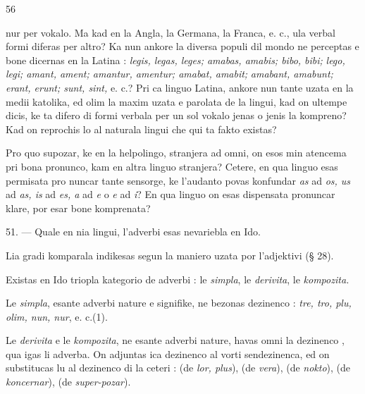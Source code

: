 \begin{VUpage}[60]{56}

\VUcontinue nur per vokalo. Ma kad en la Angla, la Germana, la Franca,\nl
e. c., ula verbal formi diferas per altro? Ka nun ankore la\nl
diversa populi dil mondo ne perceptas e bone dicernas en\nl
la Latina : \textit{legis, legas, leges; amabas, amabis; bibo, bibi;}\nl
\textit{lego, legi; amant, ament; amantur, amentur; amabat, amabit;}\nl
\textit{amabant, amabunt; erant, erunt; sunt, sint,} e. c.? Pri ca\nl
linguo Latina, ankore nun tante uzata en la medii katolika,\nl
ed olim la maxim uzata e parolata de la lingui, kad on\nl
ultempe dicis, ke ta difero di formi verbala per un sol\nl
vokalo jenas o jenis la kompreno? Kad on reprochis lo al\nl
naturala lingui che qui ta fakto existas?

Pro quo supozar, ke en la helpolingo, stranjera ad omni,\nl
on esos min atencema pri bona pronunco, kam en altra\nl
linguo stranjera? Cetere, en qua linguo esas permisata pro\cc
nuncar tante sensorge, ke l'audanto povas konfundar \textit{as} ad\nl
\textit{os, us} ad \textit{as, is} ad \textit{es, a} ad \textit{e} o \textit{e} ad \textit{i}? En qua linguo on esas\nl
dispensata pronuncar klare, por esar bone komprenata?

\VUsaut{7.19mm}
\VUsaut{5.79mm}

51. --- Quale en nia lingui, l'adverbi esas nevariebla\nl
en Ido.

Lia gradi komparala indikesas segun la maniero uzata\nl
por l'adjektivi (§ 28).

Existas en Ido triopla kategorio de adverbi : le \textit{simpla},\nl
le \textit{derivita}, le \textit{kompozita.}

Le \textit{simpla}, esante adverbi nature e signifike, ne bezonas\nl
dezinenco : \textit{tre, tro, plu, olim, nun, nur}, e. c.(1).

Le \textit{derivita} e le \textit{kompozita}, ne esante adverbi nature, havas\nl
omni la dezinenco , qua igas li adverba. On adjuntas ica\nl
dezinenco al vorti sendezinenca, ed on substitucas lu al\nl
dezinenco di la ceteri :  (de \textit{lor, plus}),  (de\nl
\textit{vera}),  (de \textit{nokto}),  (de \textit{koncernar}), \cc
{} (de \textit{super-pozar}).
\end{VUpage}

